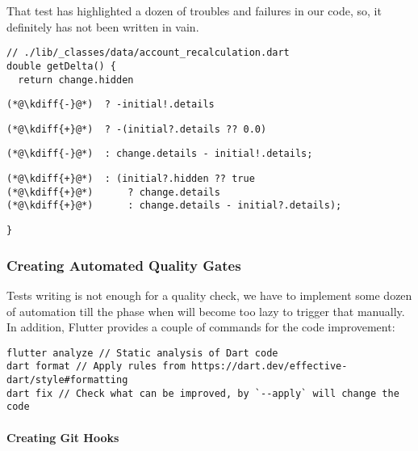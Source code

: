 \noindent That test has highlighted a dozen of troubles and failures in our code, so, it definitely has not been 
written in vain.

\begin{lstlisting}[firstnumber=17]
// ./lib/_classes/data/account_recalculation.dart
double getDelta() {
  return change.hidden
\end{lstlisting}
{
\xpretocmd{\lstlisting}{\vspace{-12pt}}{}{}
\begin{lstlisting}[firstnumber=20, backgroundcolor=\color{backred}]
(*@\kdiff{-}@*)  ? -initial!.details
\end{lstlisting}
\begin{lstlisting}[firstnumber=20, backgroundcolor=\color{backgreen}]
(*@\kdiff{+}@*)  ? -(initial?.details ?? 0.0)
\end{lstlisting}
\begin{lstlisting}[firstnumber=21, backgroundcolor=\color{backred}]
(*@\kdiff{-}@*)  : change.details - initial!.details;
\end{lstlisting}
\begin{lstlisting}[firstnumber=21, backgroundcolor=\color{backgreen}]
(*@\kdiff{+}@*)  : (initial?.hidden ?? true
(*@\kdiff{+}@*)      ? change.details
(*@\kdiff{+}@*)      : change.details - initial?.details);
\end{lstlisting}
\begin{lstlisting}[firstnumber=24]
}
\end{lstlisting}
}

\subsubsection{Creating Automated Quality Gates}

Tests writing is not enough for a quality check, we have to implement some dozen of automation till the phase 
when will become too lazy to trigger that manually. In addition, Flutter provides a couple of commands for the 
code improvement:
\begin{lstlisting}
flutter analyze // Static analysis of Dart code
dart format // Apply rules from https://dart.dev/effective-dart/style#formatting
dart fix // Check what can be improved, by `--apply` will change the code
\end{lstlisting}


\paragraph{Creating Git Hooks}

